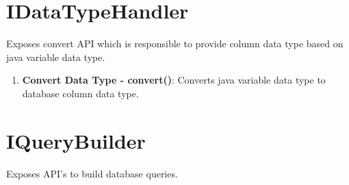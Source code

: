 \section{IDataTypeHandler}
Exposes convert API which is responsible to provide column data type based on java variable data type.




\begin{enumerate}
	
	\item \small \textbf{Convert Data Type - convert()}: Converts java variable data type to database column data type.

\end{enumerate}


\section{IQueryBuilder}
Exposes API's to build database queries.





